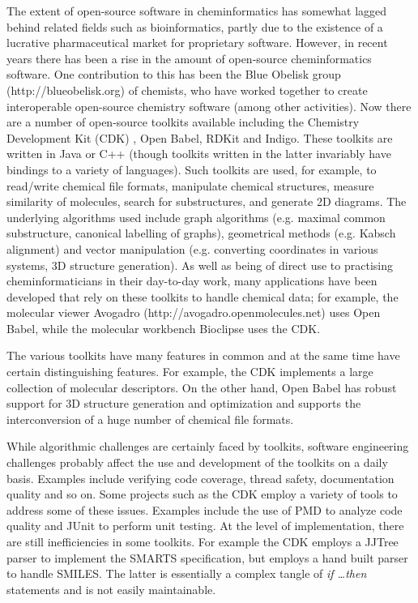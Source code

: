 \documentclass{sig-alternate}
\begin{document}
The extent of open-source software in cheminformatics has somewhat
lagged behind related fields such as bioinformatics, partly
due to the existence of a lucrative pharmaceutical market for
proprietary software. However, in recent years there has been a
rise in the amount of open-source cheminformatics software. One
contribution to this has been the Blue Obelisk group
(http://blueobelisk.org) of chemists, who have worked together to
create interoperable open-source chemistry software (among other
activities). Now there are a number of open-source toolkits available
including the Chemistry Development
Kit (CDK) \cite{steinbeck2003}, Open Babel, RDKit and Indigo. These toolkits are written in
Java or C++ (though toolkits written in the latter invariably have
bindings to a variety of languages). Such toolkits are used, for
example, to read/write chemical file formats, manipulate chemical
structures, measure similarity of molecules, search for substructures,
and generate 2D diagrams. The underlying algorithms used include graph
algorithms (e.g. maximal common substructure, canonical labelling of
graphs), geometrical methods (e.g. Kabsch alignment) and vector
manipulation (e.g. converting coordinates in various systems, 3D
structure generation). As well as being of direct use to practising
cheminformaticians in their day-to-day work, many applications have
been developed that rely on these toolkits to handle chemical data;
for example, the molecular viewer Avogadro
(http://avogadro.openmolecules.net) uses Open Babel, while the
molecular workbench Bioclipse \cite{Bioclipse2} uses the CDK.

The various toolkits have many features in common and at the same time
have certain distinguishing features. For example, the CDK implements
a large collection of molecular descriptors. On the other hand,
Open Babel has robust support for 3D structure generation and
optimization and supports the interconversion of a huge number of
chemical file formats.

While algorithmic challenges are certainly faced by toolkits, software
engineering challenges probably affect the use and development of the
toolkits on a daily basis. Examples include verifying code coverage,
thread safety, documentation quality and so on. Some projects such as
the CDK employ a variety of tools to address some of these issues.
Examples include the use of PMD to analyze code quality and JUnit to
perform unit testing. At the level of implementation, there are still
inefficiencies in some toolkits. For example the CDK employs a JJTree
parser to implement the SMARTS specification, but employs a hand built
parser to handle SMILES. The latter is essentially a complex tangle of
\emph{if \ldots then} statements and is not easily maintainable.
\end{document}
